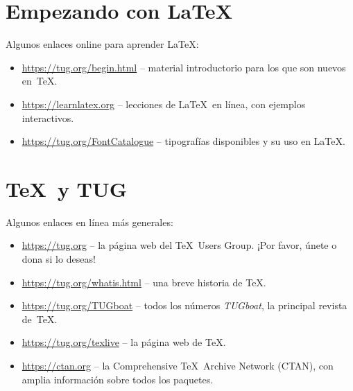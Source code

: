 \documentclass[11pt, oneside]{article}
\begin{document}
\section{Empezando con \LaTeX}

Algunos enlaces online para aprender \LaTeX:

\begin{itemize}
\item \url{https://tug.org/begin.html} -- material introductorio para los que son nuevos en~\TeX.

\item \url{https://learnlatex.org} -- lecciones de \LaTeX\ en línea, con ejemplos interactivos.

\item \url{https://tug.org/FontCatalogue} -- tipografías disponibles y su uso en
\LaTeX.

\end{itemize}


\section{\TeX\ y TUG}

Algunos enlaces en línea más generales:

\begin{itemize}
	
\item \url{https://tug.org} -- la página web del \TeX\ Users Group. 
¡Por favor, únete o dona si lo deseas!

\item \url{https://tug.org/whatis.html} -- una breve historia de  \TeX.

\item \url{https://tug.org/TUGboat} -- todos los números \textsl{TUGboat},
la principal revista de~\TeX.

\item \url{https://tug.org/texlive} -- la página web de \TeX.

\item \url{https://ctan.org} -- la Comprehensive \TeX\ Archive Network
(CTAN), con amplia información sobre todos los paquetes.

\end{itemize}
\end{document}
